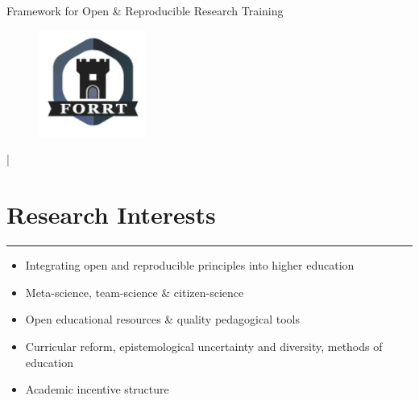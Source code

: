 \documentclass[letterpaper]{article}
\def\name{Framework for Open \& Reproducible Research Training}
\newcommand{\MYhref}[3][Gray]{\href{#2}{\color{#1}{#3}}}%
\begin{document}
\centerline{\selectfont\huge \name}


\begin{figure}
    \centering
    \includegraphics[width=3.5cm]{FORRT.png}
\end{figure}


\begin{center}
    \large \color{Gray}
\vspace{-0.5em}
\item
\hspace{-1.5em} \MYhref{mailto:info@forrt.org}{info@forrt.org} | \MYhref{https://forrt.org/}{forrt.org}
\end{center}









\section*{\color{Brown}Research Interests}
\vspace{-.5em}
\hrule
\vspace{1em}

\begin{itemize}
\item Integrating open and reproducible principles into higher education
\item Meta-science, team-science \& citizen-science
\item Open educational resources \& quality pedagogical tools
\item Curricular reform, epistemological uncertainty and diversity, methods of education
\item Academic incentive structure 
\end{itemize}




\end{document}
